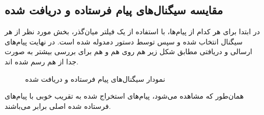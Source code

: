 \documentclass[10pt]{article}
\begin{document}
\subsection*{مقایسه سیگنال‌های پیام فرستاده و دریافت شده}
در ابتدا برای هر کدام از پیام‌ها، با استفاده از یک فیلتر میان‌گذر، بخش مورد نظر از هر سیگنال انتخاب شده و سپس توسط دستور 
دمدوله شده است. در نهایت پیام‌های ارسالی و دریافتی مطابق شکل زیر هم روی هم و هم برای بررسی بیشتر به صورت جدا از هم رسم شده اند.
\begin{figure}[h]\label{fig:q2-5}
	\begin{center}
	\end{center}
	\caption{نمودار سیگنال‌های پیام فرستاده و دریافت شده}
\end{figure}

\noindent
همان‌طور که مشاهده می‌شود، پیام‌های استخراج شده به تقریب خوبی با پیام‌های فرستاده شده اصلی برابر می‌باشند.

\newpage
\end{document}
